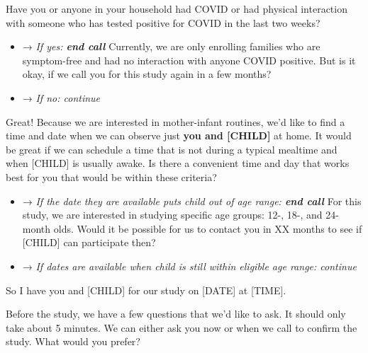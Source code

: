 \documentclass[
  12pt,
]{book}
\providecommand{\tightlist}{%
  \setlength{\itemsep}{0pt}\setlength{\parskip}{0pt}}
\begin{document}
Have you or anyone in your household had COVID or had physical interaction with someone who has tested positive for COVID in the last two weeks?

\begin{itemize}
\tightlist
\item
  → \emph{If yes: \textbf{end call} } Currently, we are only enrolling families who are symptom-free and had no interaction with anyone COVID positive. But is it okay, if we call you for this study again in a few months?
\item
  → \emph{If no: continue}
\end{itemize}

Great! Because we are interested in mother-infant routines, we'd like to find a time and date when we can observe just {\textbf{you and {[}CHILD{]}}} at home. It would be great if we can schedule a time that is not during a typical mealtime and when {[}CHILD{]} is usually awake. Is there a convenient time and day that works best for you that would be within these criteria?

\begin{itemize}
\tightlist
\item
  → \emph{If the date they are available puts child out of age range: \textbf{end call} } For this study, we are interested in studying specific age groups: 12-, 18-, and 24-month olds. Would it be possible for us to contact you in XX months to see if {[}CHILD{]} can participate then?
\item
  → \emph{If dates are available when child is still within eligible age range: continue}
\end{itemize}

So I have you and {[}CHILD{]} for our study on {[}DATE{]} at {[}TIME{]}.

Before the study, we have a few questions that we'd like to ask. It should only take about 5 minutes. We can either ask you now or when we call to confirm the study. What would you prefer?
\end{document}
